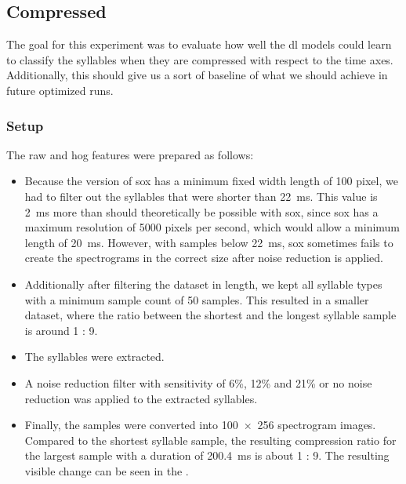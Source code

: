 \subsection{Compressed}
The goal for this experiment was to evaluate how well the \gls{dl} models could learn to classify the syllables when they are compressed with respect to the time axes. Additionally, this should give us a sort of baseline of what we should achieve in future optimized runs.
\subsubsection{Setup}
The raw and \gls{hog} features were prepared as follows:
\begin{itemize}
    \item Because the version of sox has a minimum fixed width length of 100 pixel, we had to filter out the syllables that were shorter than \SI{22}{\milli\second}.
    This value is \SI{2}{\milli\second} more than should theoretically be possible with sox, since sox has a maximum resolution of 5000 pixels per second, which would allow a minimum length of \SI{20}{\milli\second}.
    However, with samples below \SI{22}{\milli\second}, sox sometimes fails to create the spectrograms in the correct size after noise reduction is applied.
    \item Additionally after filtering the dataset in length, we kept all syllable types with a minimum sample count of 50 samples.
    This resulted in a smaller dataset, where the ratio between the shortest and the longest syllable sample is around 1 : 9.
    \item The syllables were extracted.
    \item A noise reduction filter with sensitivity of 6\%, 12\% and 21\% or no noise reduction was applied to the extracted syllables.
    \item Finally, the samples were converted into \num{100 x 256} spectrogram images.
    Compared to the shortest syllable sample, the resulting compression ratio for the largest sample with a duration of \SI{200.4}{\milli\second} is about 1 : 9. The resulting visible change can be seen in the .
\end{itemize}

